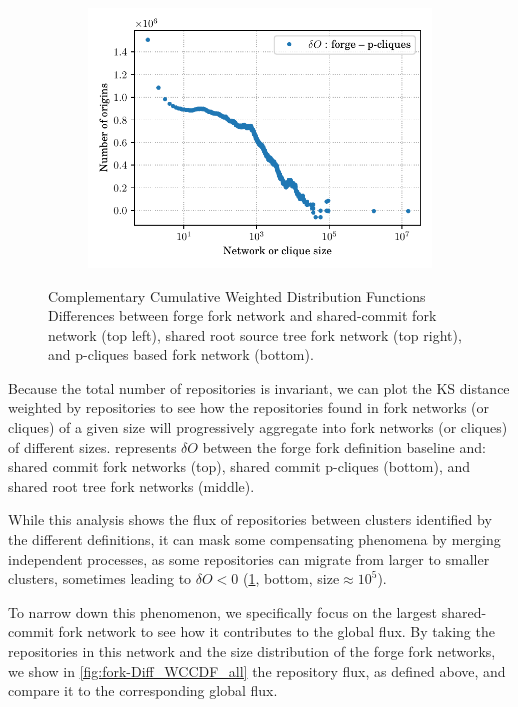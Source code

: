 \begin{figure}
\begin{subfigure}{.45\textwidth}
    \includegraphics[width=\linewidth]{img/forks/wccdf-forges-pcliques.pdf}
    \end{subfigure}
    \caption{Complementary Cumulative Weighted Distribution Functions
    Differences between forge fork network and shared-commit fork network
    (top left), shared root source tree fork network (top right), and p-cliques
    based fork network (bottom).}%
    \label{fig:fork-flux-gh-rev_rootdir_pcliques}
\end{figure}

Because the total number of repositories is invariant, we can plot the KS
distance weighted by repositories to see how the repositories found in fork
networks (or cliques) of a given size will progressively aggregate into fork
networks (or cliques) of different sizes.
 represents $\delta O$ between
the forge fork definition baseline and: shared commit fork networks (top),
shared commit p-cliques (bottom), and shared root tree fork networks (middle).

While this analysis shows the flux of repositories between clusters identified
by the different definitions, it can mask some compensating phenomena by
merging independent processes, as some repositories can migrate from larger to
smaller clusters,
sometimes leading to $\delta O<0$
(\cref{fig:fork-flux-gh-rev_rootdir_pcliques}, bottom, size$\approx 10^5$).

To narrow down this phenomenon, we specifically focus on the
largest shared-commit fork network to see how it contributes to the global
flux. By taking the repositories in this network and the size
distribution of the forge fork networks, we show in \cref{fig:fork-Diff_WCCDF_all}
the repository flux, as defined above, and compare it to the corresponding
global flux.

